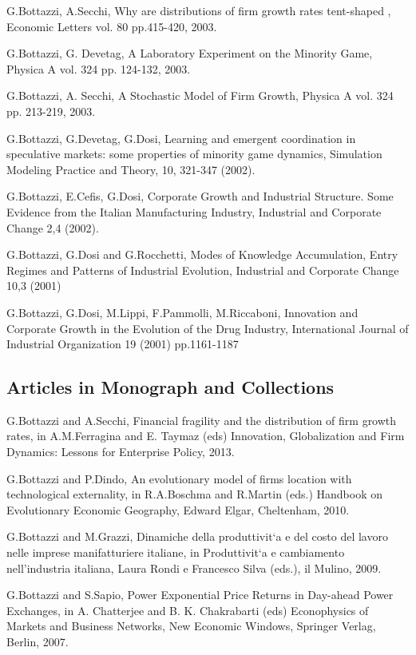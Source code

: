 \documentclass[a4paper]{article}
\begin{document}
G.Bottazzi, A.Secchi, Why are distributions of firm growth rates
tent-shaped , Economic Letters vol. 80 pp.415-420, 2003.

G.Bottazzi, G. Devetag, A Laboratory Experiment on the Minority Game,
Physica A vol. 324 pp. 124-132, 2003.

G.Bottazzi, A. Secchi, A Stochastic Model of Firm Growth, Physica A
vol. 324 pp. 213-219, 2003.

G.Bottazzi, G.Devetag, G.Dosi, Learning and emergent coordination in
speculative markets: some properties of \textquotedbl{}minority game\textquotedbl{} dynamics,
Simulation Modeling Practice and Theory, 10, 321-347 (2002).

G.Bottazzi, E.Cefis, G.Dosi, Corporate Growth and Industrial
Structure. Some Evidence from the Italian Manufacturing Industry,
Industrial and Corporate Change 2,4 (2002).

G.Bottazzi, G.Dosi and G.Rocchetti, Modes of Knowledge Accumulation,
Entry Regimes and Patterns of Industrial Evolution, Industrial and
Corporate Change 10,3 (2001)

G.Bottazzi, G.Dosi, M.Lippi, F.Pammolli, M.Riccaboni, Innovation and
Corporate Growth in the Evolution of the Drug Industry, International
Journal of Industrial Organization 19 (2001) pp.1161-1187


\subsection{Articles in Monograph and Collections%
  \label{articles-in-monograph-and-collections}%
}

G.Bottazzi and A.Secchi, Financial fragility and the distribution of
firm growth rates, in A.M.Ferragina and E. Taymaz (eds) \textquotedbl{}Innovation,
Globalization and Firm Dynamics: Lessons for Enterprise Policy\textquotedbl{}, 2013.

G.Bottazzi and P.Dindo, An evolutionary model of firms location with
technological externality, in R.A.Boschma and R.Martin (eds.)
\textquotedbl{}Handbook on Evolutionary Economic Geography\textquotedbl{}, Edward Elgar,
Cheltenham, 2010.

G.Bottazzi and M.Grazzi, Dinamiche della produttivit`a e del costo
del lavoro nelle imprese manifatturiere italiane, in Produttivit`a e
cambiamento nell'industria italiana, Laura Rondi e Francesco Silva
(eds.), il Mulino, 2009.

G.Bottazzi and S.Sapio, Power Exponential Price Returns in Day-ahead
Power Exchanges, in A. Chatterjee and B. K. Chakrabarti (eds)
\textquotedbl{}Econophysics of Markets and Business Networks\textquotedbl{}, New Economic Windows,
Springer Verlag, Berlin, 2007.
\end{document}
